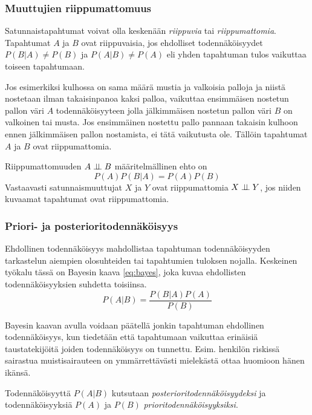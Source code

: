 \subsubsection{Muuttujien riippumattomuus}
Satunnaistapahtumat voivat olla keskenään \emph{riippuvia} tai \emph{riippumattomia}. Tapahtumat $A$ ja $B$ ovat riippuvaisia, jos ehdolliset todennäköisyydet $P(B|A) \not= P(B)$ ja $P(A|B) \not= P(A)$ eli yhden tapahtuman tulos vaikuttaa toiseen tapahtumaan.

Jos esimerkiksi  kulhossa on sama määrä mustia ja valkoisia palloja ja niistä nostetaan ilman takaisinpanoa kaksi palloa, vaikuttaa ensimmäisen nostetun pallon väri $A$ todennäköisyyteen jolla jälkimmäisen nostetun pallon väri $B$ on valkoinen tai musta. Jos ensimmäinen nostettu pallo pannaan takaisin kulhoon ennen jälkimmäisen pallon nostamista, ei tätä vaikutusta ole. Tällöin tapahtumat $A$ ja $B$ ovat riippumattomia. 

Riippumattomuuden $A \perp \!\!\! \perp B$ määritelmällinen ehto on
$$
    P(A)P(B|A) = P(A)P(B) 
$$ 
Vastaavasti satunnaismuuttujat $X$ ja $Y$ ovat riippumattomia $X \perp \!\!\! \perp Y$, jos niiden kuvaamat tapahtumat ovat riippumattomia. 



\subsubsection{Priori- ja posterioritodennäköisyys}
Ehdollinen todennäköisyys mahdollistaa  tapahtuman todennäköisyyden tarkastelun aiempien olosuhteiden tai tapahtumien tuloksen nojalla. Keskeinen työkalu tässä on Bayesin kaava \ref{eq:bayes}, joka kuvaa ehdollisten todennäköisyyksien suhdetta toisiinsa.
\begin{equation}\label{eq:bayes}
        P(A|B) = \frac{P(B|A)P(A)}{P(B)}
\end{equation}

Bayesin kaavan avulla voidaan päätellä jonkin tapahtuman ehdollinen todennäköisyys, kun tiedetään että tapahtumaan vaikuttaa erinäisiä taustatekijöitä joiden todennäköisyys on tunnettu. Esim. henkilön riskissä sairastua muistisairauteen on ymmärrettävästi mielekästä ottaa huomioon hänen ikänsä.

Todennäköisyyttä $P(A|B)$ kutsutaan \emph{posterioritodennäköisyydeksi} ja todennäköisyyksiä $P(A)$ ja $P(B)$ \emph{prioritodennäköisyyksiksi}.



 

